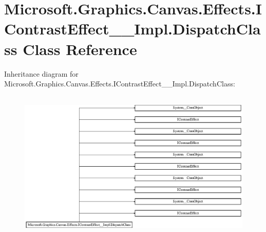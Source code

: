 \hypertarget{class_microsoft_1_1_graphics_1_1_canvas_1_1_effects_1_1_i_contrast_effect_____impl_1_1_dispatch_class}{}\section{Microsoft.\+Graphics.\+Canvas.\+Effects.\+I\+Contrast\+Effect\+\_\+\+\_\+\+Impl.\+Dispatch\+Class Class Reference}
\label{class_microsoft_1_1_graphics_1_1_canvas_1_1_effects_1_1_i_contrast_effect_____impl_1_1_dispatch_class}
Inheritance diagram for Microsoft.\+Graphics.\+Canvas.\+Effects.\+I\+Contrast\+Effect\+\_\+\+\_\+\+Impl.\+Dispatch\+Class\+:\begin{figure}[H]
\begin{center}
\leavevmode
\includegraphics[height=7.247059cm]{class_microsoft_1_1_graphics_1_1_canvas_1_1_effects_1_1_i_contrast_effect_____impl_1_1_dispatch_class}
\end{center}
\end{figure}
